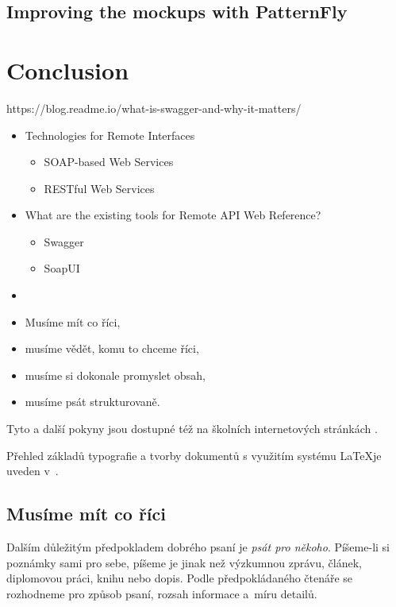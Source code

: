\section{Improving the mockups with PatternFly}

\chapter{Conclusion}
https://blog.readme.io/what-is-swagger-and-why-it-matters/

\begin{itemize}
  \item Technologies for Remote Interfaces
  \begin{itemize}
    \item SOAP-based Web Services
    \item RESTful Web Services
  \end{itemize}
  \item What are the existing tools for Remote API Web Reference?
  \begin{itemize}
    \item Swagger
    \item SoapUI
  \end{itemize}
  \item 
\end{itemize}

\begin{itemize}
\item Musíme mít co říci,
\item musíme vědět, komu to chceme říci,
\item musíme si dokonale promyslet obsah,
\item musíme psát strukturovaně. 
\end{itemize}

Tyto a další pokyny jsou dostupné též na školních internetových stránkách \cite{fitWeb}.

Přehled základů typografie a tvorby dokumentů s využitím systému \LaTeX je 
uveden v~\cite{Rybicka}.

\section{Musíme mít co říci}
Dalším důležitým předpokladem dobrého psaní je {\it psát pro někoho}. Píšeme-li si poznámky sami pro sebe, píšeme je jinak než výzkumnou zprávu, článek, diplomovou práci, knihu nebo dopis. Podle předpokládaného čtenáře se rozhodneme pro způsob psaní, rozsah informace a~míru detailů.

